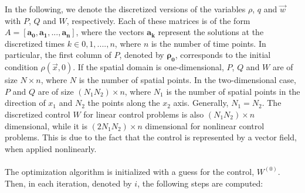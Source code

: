 \documentclass[11pt, a4paper]{article}
\theoremstyle{definition}
\newcommand{\adj}{q}
\begin{document}
In the following, we denote the discretized versions of the variables $\rho$, $\adj$ and $\vec{w}$ with $P$, $Q$ and $W$, respectively. Each of these matrices is of the form $A = [\boldsymbol{a_0}, \boldsymbol{a_1}, ... ,\boldsymbol{a_n}]$, where the vectors $\boldsymbol{a_k}$ represent the solutions at the discretized times $k \in 0,1,....,n$, where $n$ is the number of time points. In particular, the first column of $P$, denoted by $\boldsymbol{\rho_0}$, corresponds to the initial condition $\rho(\vec{x},0)$. If the spatial domain is one-dimensional, $P$, $Q$ and $W$ are of size $N \times n$, where $N$ is the number of spatial points. In the two-dimensional case, $P$ and $Q$ are of size $(N_1N_2) \times n$, where $N_1$ is the number of spatial points in the direction of $x_1$ and $N_2$ the points along the $x_2$ axis. Generally, $N_1 = N_2$. The discretized control $W$ for linear control problems is also $(N_1N_2) \times n$ dimensional, while it is $(2N_1N_2) \times n$ dimensional for nonlinear control problems. This is due to the fact that the control is represented by a vector field, when applied nonlinearly.
\\
\\
The optimization algorithm is initialized with a guess for the control, $W^{(0)}$. Then, in each iteration, denoted by $i$, the following steps are computed:
\vspace{0.1cm}
\end{document}
